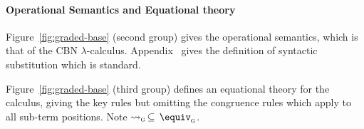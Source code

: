 \paragraph{Operational Semantics and Equational theory}

Figure~\ref{fig:graded-base} (second group) gives the
operational semantics, which is that of the CBN
$\lambda$-calculus. Appendix~ gives the definition of syntactic
substitution which is standard.

Figure~\ref{fig:graded-base} (third group) defines an equational theory
for the calculus, giving the key rules but omitting the congruence
rules which apply to all sub-term positions. Note $ \rightsquigarrow_{\textsc{g} }  \, \subseteq \,  \equiv_{\textsc{g} } $.
